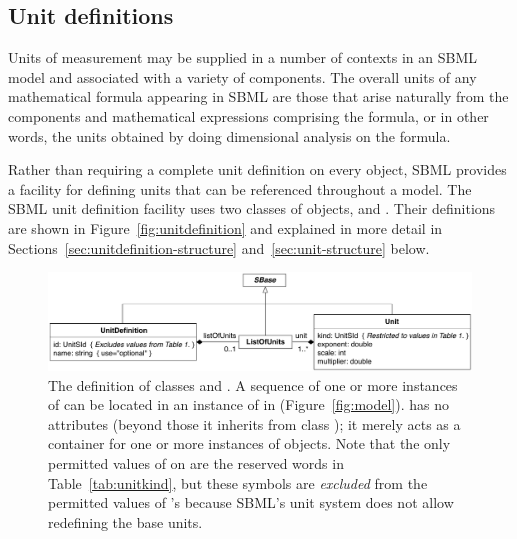 \subsection{Unit definitions}
\label{sec:unitdefinitions}

Units of measurement may be supplied in a number of contexts in an
SBML model and associated with a variety of components.  The
overall units of any mathematical formula appearing in SBML are
those that arise naturally from the components and mathematical
expressions comprising the formula, or in other words, the units
obtained by doing dimensional analysis on the formula.

Rather than requiring a complete unit definition on every object,
SBML provides a facility for defining units that can be referenced
throughout a model.  The SBML unit definition facility uses two
classes of objects, \UnitDefinition and \Unit.  Their definitions
are shown in Figure~\vref{fig:unitdefinition} and explained in
more detail in Sections~\ref{sec:unitdefinition-structure}
and~\ref{sec:unit-structure} below.

\begin{figure}[htb]
  \centering
  \includegraphics[scale=0.79]{figs/unitdefinition-uml}
  \caption{The definition of classes \UnitDefinition and
      \Unit.  A sequence of one or more instances of
      \UnitDefinition can be located in an instance of
      \ListOfUnitDefinitions in \Model
      (Figure~\protect\ref{fig:model}).   has
      no attributes (beyond those it inherits from class \SBase);
      it merely acts as a container for one or more instances of
      \Unit objects.  Note that the only permitted values of
       on \Unit are the reserved words in
      Table~\vref{tab:unitkind}, but these symbols are
      \emph{excluded} from the permitted values of
      \UnitDefinition's  because SBML's unit system does
      not allow redefining the base units.}
  \label{fig:unitdefinition}
\end{figure}

